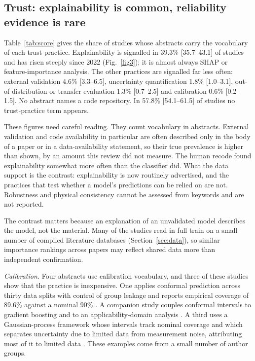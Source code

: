 \documentclass[pdflatex,sn-basic]{sn-jnl}
\begin{document}
\subsection{Trust: explainability is common, reliability evidence is rare}\label{sec:trust}

Table~\ref{tab:score} gives the share of studies whose abstracts carry the vocabulary of each trust practice. Explainability is signalled in 39.3\% [35.7--43.1] of studies and has risen steeply since 2022 (Fig.~\ref{fig3}); it is almost always SHAP or feature-importance analysis. The other practices are signalled far less often: external validation 4.6\% [3.3--6.5], uncertainty quantification 1.8\% [1.0--3.1], out-of-distribution or transfer evaluation 1.3\% [0.7--2.5] and calibration 0.6\% [0.2--1.5]. No abstract names a code repository. In 57.8\% [54.1--61.5] of studies no trust-practice term appears.

These figures need careful reading. They count vocabulary in abstracts. External validation and code availability in particular are often described only in the body of a paper or in a data-availability statement, so their true prevalence is higher than shown, by an amount this review did not measure. The human recode found explainability somewhat more often than the classifier did. What the data support is the contrast: explainability is now routinely advertised, and the practices that test whether a model's predictions can be relied on are not. Robustness and physical consistency cannot be assessed from keywords and are not reported.

The contrast matters because an explanation of an unvalidated model describes the model, not the material. Many of the studies read in full train on a small number of compiled literature databases (Section~\ref{sec:data}), so similar importance rankings across papers may reflect shared data more than independent confirmation.

\emph{Calibration.} Four abstracts use calibration vocabulary, and three of these studies show that the practice is inexpensive. One applies conformal prediction across thirty data splits with control of group leakage and reports empirical coverage of 89.6\% against a nominal 90\% \citep{parakhiya2026}. A companion study couples conformal intervals to gradient boosting and to an applicability-domain analysis \citep{jagad2026}. A third uses a Gaussian-process framework whose intervals track nominal coverage and which separates uncertainty due to limited data from measurement noise, attributing most of it to limited data \citep{chan2026}. These examples come from a small number of author groups.
\end{document}
